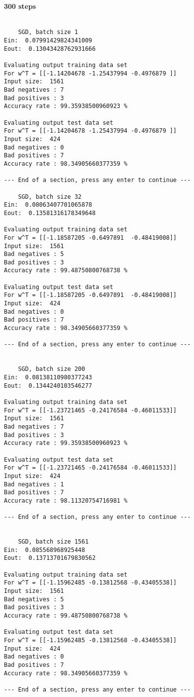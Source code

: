    
      \paragraph{300 steps} 
\begin{verbatim}

	SGD, batch size 1
Ein:  0.07991429824341009
Eout:  0.13043428762931666

Evaluating output training data set
For w^T = [[-1.14204678 -1.25437994 -0.4976879 ]]
Input size:  1561
Bad negatives : 7
Bad positives : 3
Accuracy rate : 99.35938500960923 %

Evaluating output test data set
For w^T = [[-1.14204678 -1.25437994 -0.4976879 ]]
Input size:  424
Bad negatives : 0
Bad positives : 7
Accuracy rate : 98.34905660377359 %

--- End of a section, press any enter to continue ---

	SGD, batch size 32
Ein:  0.08063407701065878
Eout:  0.13581316178349648

Evaluating output training data set
For w^T = [[-1.18587205 -0.6497891  -0.48419008]]
Input size:  1561
Bad negatives : 5
Bad positives : 3
Accuracy rate : 99.48750800768738 %

Evaluating output test data set
For w^T = [[-1.18587205 -0.6497891  -0.48419008]]
Input size:  424
Bad negatives : 0
Bad positives : 7
Accuracy rate : 98.34905660377359 %

--- End of a section, press any enter to continue ---


	SGD, batch size 200
Ein:  0.08138110980377243
Eout:  0.1344240103546277

Evaluating output training data set
For w^T = [[-1.23721465 -0.24176584 -0.46011533]]
Input size:  1561
Bad negatives : 7
Bad positives : 3
Accuracy rate : 99.35938500960923 %

Evaluating output test data set
For w^T = [[-1.23721465 -0.24176584 -0.46011533]]
Input size:  424
Bad negatives : 1
Bad positives : 7
Accuracy rate : 98.11320754716981 %

--- End of a section, press any enter to continue ---


	SGD, batch size 1561
Ein:  0.085568968925448
Eout:  0.13713701679830562

Evaluating output training data set
For w^T = [[-1.15962485 -0.13812568 -0.43405538]]
Input size:  1561
Bad negatives : 5
Bad positives : 3
Accuracy rate : 99.48750800768738 %

Evaluating output test data set
For w^T = [[-1.15962485 -0.13812568 -0.43405538]]
Input size:  424
Bad negatives : 0
Bad positives : 7
Accuracy rate : 98.34905660377359 %

--- End of a section, press any enter to continue ---

\end{verbatim}



